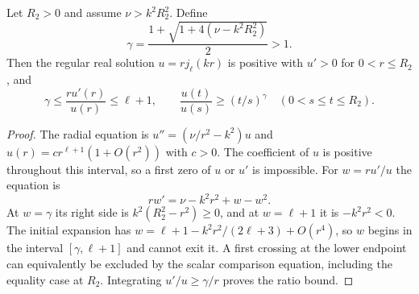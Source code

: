\begin{lemma}
\label{cn:radial-growth}
Let $R_2>0$ and assume $\nu>k^2R_2^2$.  Define
\begin{equation}\label{cn:exponent}
 \gamma=\frac{1+\sqrt{1+4(\nu-k^2R_2^2)}}2>1.
\end{equation}
Then the regular real solution $u=rj_\ell(kr)$ is positive with
$u'>0$ for $0<r\leq R_2$, and
\begin{equation}\label{cn:log-derivative}
 \gamma\leq\frac{ru'(r)}{u(r)}\leq\ell+1,
 \qquad
 \frac{u(t)}{u(s)}\geq(t/s)^\gamma
 \quad(0<s\leq t\leq R_2).
\end{equation}
\end{lemma}
\begin{proof}
The radial equation is
$u''=(\nu/r^2-k^2)u$ and
$u(r)=c r^{\ell+1}(1+O(r^2))$ with $c>0$.
The coefficient of $u$ is positive throughout this interval, so a
first zero of $u$ or $u'$ is impossible.  For $w=ru'/u$ the equation is
\begin{equation}\label{cn:riccati}
 rw'=\nu-k^2r^2+w-w^2.
\end{equation}
At $w=\gamma$ its right side is
$k^2(R_2^2-r^2)\geq0$, and at $w=\ell+1$ it is $-k^2r^2<0$.
The initial expansion has
$w=\ell+1-k^2r^2/(2\ell+3)+O(r^4)$, so $w$ begins in the
interval $[\gamma,\ell+1]$ and cannot exit it.  A first crossing at
the lower endpoint can equivalently be excluded by the scalar
comparison equation, including the equality case at $R_2$.
Integrating $u'/u\geq\gamma/r$ proves the ratio bound.
\end{proof}

